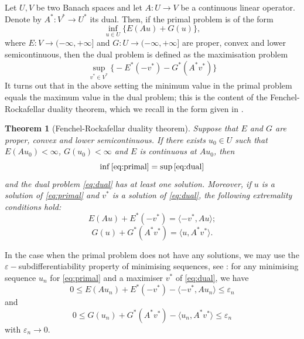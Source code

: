 \documentclass[reqno,12pt]{amsart}
\newtheorem{theorem}{Theorem}[section]
\numberwithin{equation}{section}
\begin{document}
Let $U, V$ be two Banach spaces and let $A: U \rightarrow V$ be a continuous linear operator. Denote by $A^*: V^* \rightarrow U^*$ its dual. Then, if the primal problem is of the form
\begin{equation}\tag{P}\label{eq:primal}
\inf_{u \in U} \bigg\{ E(Au) + G(u) \bigg\},
\end{equation}
where $E: V \rightarrow (-\infty,+\infty]$ and $G: U \rightarrow (-\infty,+\infty]$ are proper, convex and lower semicontinuous, then the dual problem is defined as the maximisation problem
\begin{equation}\tag{P*}\label{eq:dual}
\sup_{v^* \in V^*} \bigg\{ - E^*(-v^*) - G^*(A^* v^*) \bigg\}
\end{equation}
It turns out that in the above setting the minimum value in the primal problem equals the maximum value in the dual problem; this is the content of the Fenchel-Rockafellar duality theorem, which we recall in the form given in \cite[Remark III.4.2]{EkelandTemam}. 

\begin{theorem}[Fenchel-Rockafellar duality theorem]\label{thm:fenchelrockafellar}
Suppose that $E$ and $G$ are proper, convex and lower semicontinuous. If there exists $u_0 \in U$ such that $E(A u_0) < \infty$, $G(u_0) < \infty$ and $E$ is continuous at $A u_0$, then
$$\inf \eqref{eq:primal} = \sup \eqref{eq:dual}$$
and the dual problem \eqref{eq:dual} has at least one solution. Moreover, if $u$ is a solution of \eqref{eq:primal} and $v^*$ is a solution of \eqref{eq:dual}, the following extremality conditions hold:
\begin{equation}
E(Au) + E^*(-v^*) = \langle -v^*, Au \rangle;
\end{equation}
\begin{equation}
G(u) + G^*(A^* v^*) = \langle u, A^* v^* \rangle.
\end{equation}
\end{theorem}

In the case when the primal problem does not have any solutions, we may use the $\varepsilon-$subdifferentiability property of minimising sequences, see \cite[Proposition V.1.2]{EkelandTemam}: for any minimising sequence $u_n$ for \eqref{eq:primal} and a maximiser $v^*$ of \eqref{eq:dual}, we have
\begin{equation}\label{eq:epsilonsubdiff1}
0 \leq E(Au_n) + E^*(-v^*) - \langle -v^*, Au_n \rangle \leq \varepsilon_n
\end{equation}
and
\begin{equation}\label{eq:epsilonsubdiff2}
0 \leq G(u_n) + G^*(A^* v^*) - \langle u_n, A^* v^* \rangle \leq \varepsilon_n
\end{equation}
with $\varepsilon_n \rightarrow 0$.
\end{document}
